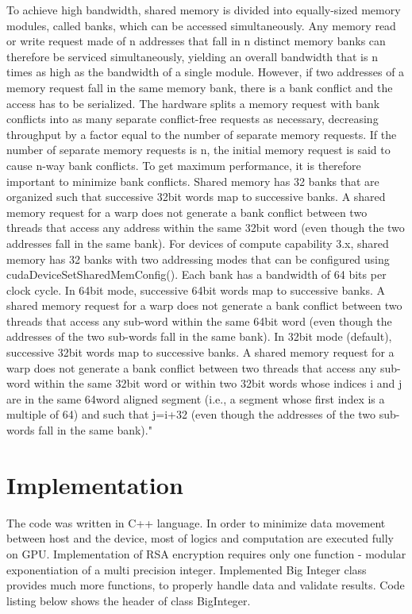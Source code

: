 \documentclass[oneside,openright,12pt,final,en]{mgr}
\begin{document}
To achieve high bandwidth, shared memory is divided into equally-sized memory modules, called banks, which can be accessed simultaneously. Any memory read or write request made of n addresses that fall in n distinct memory banks can therefore be serviced simultaneously, yielding an overall bandwidth that is n times as high as the bandwidth of a single module. However, if two addresses of a memory request fall in the same memory bank, there is a bank conflict and the access has to be serialized. The hardware splits a memory request with bank conflicts into as many separate conflict-free requests as necessary, decreasing throughput by a factor equal to the number of separate memory requests. If the number of separate memory requests is n, the initial memory request is said to cause n-way bank conflicts. To get maximum performance, it is therefore important to minimize bank conflicts.
Shared memory has 32 banks that are organized such that successive 32bit words map to successive banks. A shared memory request for a warp does not generate a bank conflict between two threads that access any address within the same 32bit word (even though the two addresses fall in the same bank).
For devices of compute capability 3.x, shared memory has 32 banks with two addressing modes that can be configured using cudaDeviceSetSharedMemConfig(). Each bank has a bandwidth of 64 bits per clock cycle. In 64bit mode, successive 64bit words map to successive banks. A shared memory request for a warp does not generate a bank conflict between two threads that access any sub-word within the same 64bit word (even though the addresses of the two sub-words fall in the same bank). In 32bit mode (default), successive 32bit words map to successive banks. A shared memory request for a warp does not generate a bank conflict between two threads that access any sub-word within the same 32bit word or within two 32bit words whose indices i and j are in the same 64word aligned segment (i.e., a segment whose first index is a multiple of 64) and such that j=i+32 (even though the addresses of the two sub-words fall in the same bank)."\cite{nsight}

\chapter{Implementation}

The code was written in C++ language. In order to minimize data movement between host and the device, most of logics and computation are executed fully on GPU. Implementation of RSA encryption requires only one function - modular exponentiation of a multi precision integer. Implemented Big Integer class provides much more functions, to properly handle data and validate results. Code listing below shows the header of class BigInteger.
\end{document}

